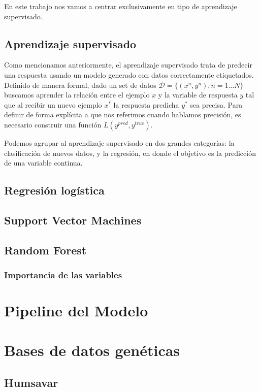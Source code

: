 En este trabajo nos vamos a centrar exclusivamente en tipo de aprendizaje supervisado.

\subsection{Aprendizaje supervisado}

Como mencionamos anteriormente, el aprendizaje supervisado trata de predecir una respuesta usando un modelo generado con datos correctamente etiquetados. Definido de manera formal, dado un set de datos $ \mathcal{D} = \{(x^n, y^n), n = 1...N\}$  buscamos aprender la relación entre el ejemplo $x$ y la variable de respuesta $y$ tal que al recibir un nuevo ejemplo $x^*$ la respuesta predicha $y^*$ sea precisa. Para definir de forma explícita a que nos referimos cuando hablamos precisión, es necesario construir una función $L(y^{pred}, y^{true})$.  

Podemos agrupar al aprendizaje supervisado en dos grandes categorías: la clasificación de nuevos datos, y la regresión, en donde el objetivo es la predicción de una variable continua. 

\subsection{Regresión logística}

\subsection{Support Vector Machines}

\subsection{Random Forest}

\subsubsection{Importancia de las variables}


\section{Pipeline del Modelo}

\section{Bases de datos genéticas}

\subsection{Humsavar}

